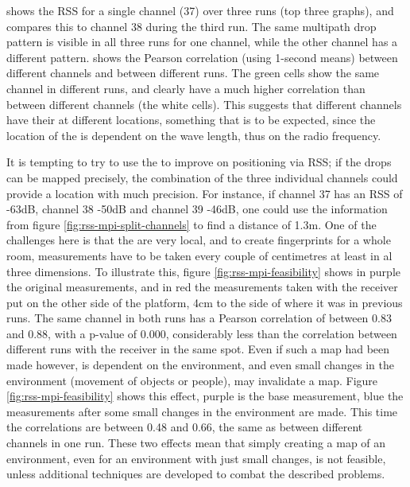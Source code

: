  shows the RSS for a single channel (37) over three runs (top three graphs), and compares this to channel 38 during the third run.
The same multipath drop pattern is visible in all three runs for one channel, while the other channel has a different pattern.
 shows the Pearson correlation (using 1-second means) between different channels and between different runs.
The green cells show the same channel in different runs, and clearly have a much higher correlation than between different channels (the white cells).
This suggests that different channels have their \mpids at different locations, something that is to be expected, since the location of the \mpids is dependent on the wave length, thus on the radio frequency.


It is tempting to try to use the \mpids to improve on positioning via RSS; if the drops can be mapped precisely, the combination of the three individual channels could provide a location with much precision.
For instance, if channel 37 has an RSS of -63dB, channel 38 -50dB and channel 39 -46dB, one could use the information from figure \ref{fig:rss-mpi-split-channels} to find a distance of 1.3m.
One of the challenges here is that the \mpids are very local, and to create fingerprints for a whole room, measurements have to be taken every couple of centimetres at least in al three dimensions.
To illustrate this, figure \ref{fig:rss-mpi-feasibility} shows in purple the original measurements, and in red the measurements taken with the receiver put on the other side of the platform, 4cm to the side of where it was in previous runs.
The same channel in both runs has a Pearson correlation of between 0.83 and 0.88, with a p-value of 0.000, considerably less than the correlation between different runs with the receiver in the same spot.
Even if such a map had been made however, \mpi is dependent on the environment, and even small changes in the environment (movement of objects or people), may invalidate a map.
Figure \ref{fig:rss-mpi-feasibility} shows this effect, purple is the base measurement, blue the measurements after some small changes in the environment are made.
This time the correlations are between 0.48 and 0.66, the same as between different channels in one run.
These two effects mean that simply creating a map of an environment, even for an environment with just small changes, is not feasible, unless additional techniques are developed to combat the described problems.

